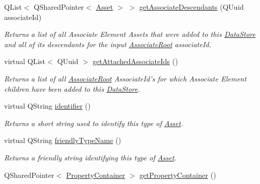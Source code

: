 \begin{DoxyCompactItemize}
Q\-List$<$ Q\-Shared\-Pointer$<$ \hyperlink{class_picto_1_1_asset}{Asset} $>$ $>$ \hyperlink{class_picto_1_1_data_store_adbf0686b90930f15b2e3d02476dff8d2}{get\-Associate\-Descendants} (Q\-Uuid associate\-Id)
\begin{DoxyCompactList}\small\item\em Returns a list of all Associate Element Assets that were added to this \hyperlink{class_picto_1_1_data_store}{Data\-Store} and all of its descendants for the input \hyperlink{class_picto_1_1_associate_root}{Associate\-Root} associate\-Id. \end{DoxyCompactList}\item 
\hypertarget{class_picto_1_1_data_store_aa4c4a99cb23a5de890b460a012701a42}{virtual Q\-List$<$ Q\-Uuid $>$ \hyperlink{class_picto_1_1_data_store_aa4c4a99cb23a5de890b460a012701a42}{get\-Attached\-Associate\-Ids} ()}\label{class_picto_1_1_data_store_aa4c4a99cb23a5de890b460a012701a42}

\begin{DoxyCompactList}\small\item\em Returns a list of all \hyperlink{class_picto_1_1_associate_root}{Associate\-Root} Associate\-Id's for which Associate Element children have been added to this \hyperlink{class_picto_1_1_data_store}{Data\-Store}. \end{DoxyCompactList}\item 
virtual Q\-String \hyperlink{class_picto_1_1_data_store_a15740a59d6164f14648355bfcb993b50}{identifier} ()
\begin{DoxyCompactList}\small\item\em Returns a short string used to identify this type of \hyperlink{class_picto_1_1_asset}{Asset}. \end{DoxyCompactList}\item 
virtual Q\-String \hyperlink{class_picto_1_1_data_store_a964af19f287fffb7efb36a5f818704ab}{friendly\-Type\-Name} ()
\begin{DoxyCompactList}\small\item\em Returns a friendly string identifying this type of \hyperlink{class_picto_1_1_asset}{Asset}. \end{DoxyCompactList}\item 
\hypertarget{class_picto_1_1_data_store_a20982eec86e63721c773dcc4404f8d8f}{Q\-Shared\-Pointer$<$ \hyperlink{class_picto_1_1_property_container}{Property\-Container} $>$ \hyperlink{class_picto_1_1_data_store_a20982eec86e63721c773dcc4404f8d8f}{get\-Property\-Container} ()}\label{class_picto_1_1_data_store_a20982eec86e63721c773dcc4404f8d8f}


\end{DoxyCompactItemize}
